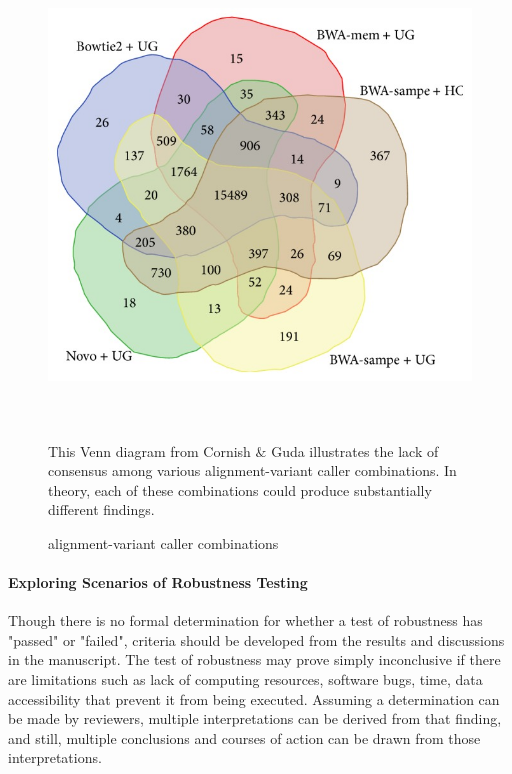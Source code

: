 \documentclass{drexelthesis}
\begin{document}
\begin{figure}[h!]
	\centering
	\includegraphics[width=13.76cm,height=12.09cm]{./images/venn.png}
	\caption{alignment-variant caller combinations}
	\medskip
	\small
	This Venn diagram from Cornish $\&$ Guda illustrates the lack of consensus among various alignment-variant caller combinations. In theory, each of these combinations could produce substantially different findings. \cite{Cornish2015-qo}
	\label{venn}
\end{figure}


\paragraph{Exploring Scenarios of Robustness Testing}

Though there is no formal determination for whether a test of robustness has "passed" or "failed", criteria should be developed from the results and discussions in the manuscript. The test of robustness may prove simply inconclusive if there are limitations such as lack of computing resources, software bugs, time, data accessibility that prevent it from being executed. Assuming a determination can be made by reviewers, multiple interpretations can be derived from that finding, and still, multiple conclusions and courses of action can be drawn from those interpretations.
\end{document}
